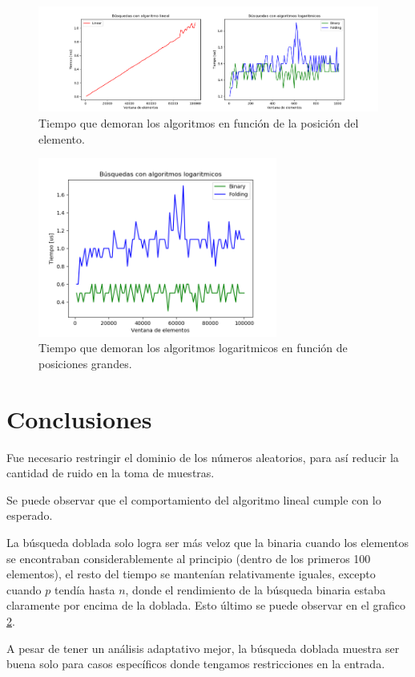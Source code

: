 \documentclass[]{article}
\begin{document}
\begin{figure}[tb]
	\centering
	\includegraphics[width=1\textwidth]{Busqueda por p}
	\caption{Tiempo que demoran los algoritmos en función de la posición del elemento.}
	\label{fig:2}
\end{figure}

\begin{figure}[tb]
	\centering
	\includegraphics[width=0.7\textwidth]{Busqueda por p grande}
	\caption{Tiempo que demoran los algoritmos logaritmicos en función de posiciones grandes.}
	\label{fig:3}
\end{figure}

\section{Conclusiones}

Fue necesario restringir el dominio de los números aleatorios, para así reducir la cantidad de ruido en la toma de muestras.

Se puede observar que el comportamiento del algoritmo lineal cumple con lo esperado.

La búsqueda doblada solo logra ser más veloz que la binaria cuando los elementos se encontraban considerablemente al principio (dentro de los primeros 100 elementos), el resto del tiempo se mantenían relativamente iguales, excepto cuando $p$ tendía hasta $n$, donde el rendimiento de la búsqueda binaria estaba claramente por encima de la doblada. Esto último se puede observar en el grafico \ref{fig:3}.

A pesar de tener un análisis adaptativo mejor, la búsqueda doblada muestra ser buena solo para casos específicos donde tengamos restricciones en la entrada.
\end{document}
